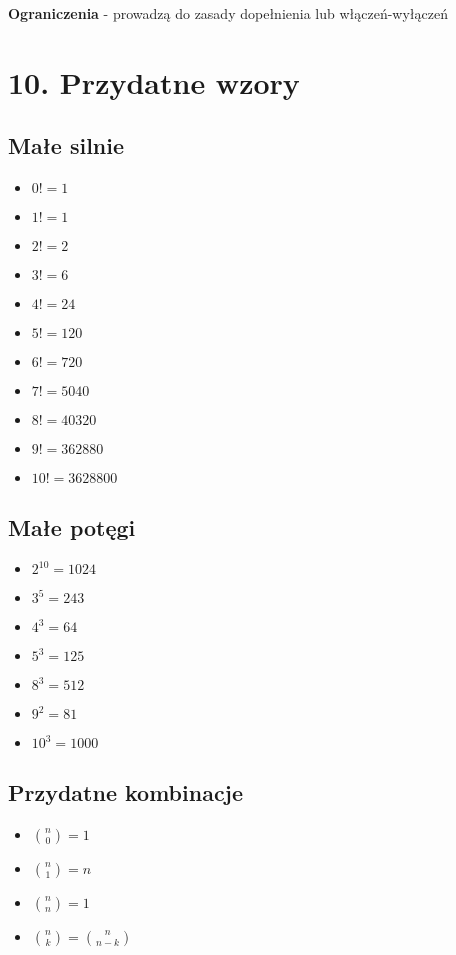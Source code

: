 \documentclass[10pt,a4paper]{article}
\begin{document}
\begin{multicols}{2}
\textbf{Ograniczenia} - prowadzą do zasady dopełnienia lub włączeń-wyłączeń

\section*{10. Przydatne wzory}

\subsection*{Małe silnie}
\begin{itemize}
\item $0! = 1$
\item $1! = 1$
\item $2! = 2$
\item $3! = 6$
\item $4! = 24$
\item $5! = 120$
\item $6! = 720$
\item $7! = 5040$
\item $8! = 40320$
\item $9! = 362880$
\item $10! = 3628800$
\end{itemize}

\subsection*{Małe potęgi}
\begin{itemize}
\item $2^{10} = 1024$
\item $3^5 = 243$
\item $4^3 = 64$
\item $5^3 = 125$
\item $8^3 = 512$
\item $9^2 = 81$
\item $10^3 = 1000$
\end{itemize}

\subsection*{Przydatne kombinacje}
\begin{itemize}
\item $\binom{n}{0} = 1$
\item $\binom{n}{1} = n$
\item $\binom{n}{n} = 1$
\item $\binom{n}{k} = \binom{n}{n-k}$
\end{itemize}

\end{multicols}
\end{document}

